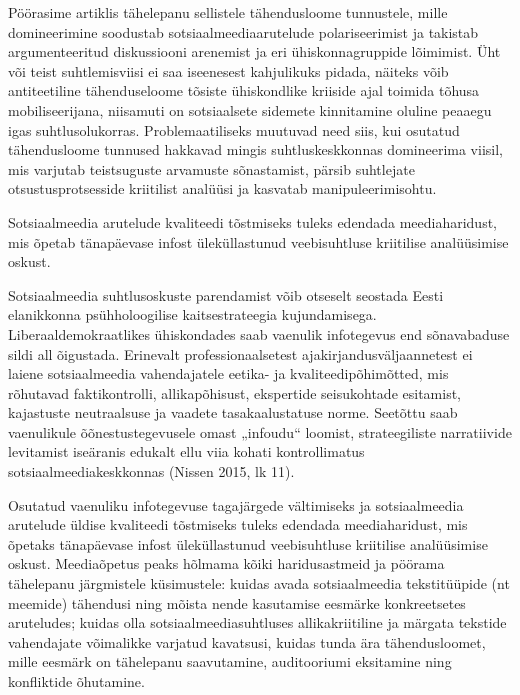 \documentclass[estonian,]{article}
\begin{document}
Pöörasime artiklis tähelepanu sellistele tähendusloome tunnustele, mille domineerimine soodustab sotsiaalmeediaarutelude polariseerimist ja takistab argumenteeritud diskussiooni arenemist ja eri ühiskonnagruppide lõimimist. Üht või teist suhtlemisviisi ei saa iseenesest kahjulikuks pidada, näiteks võib antiteetiline tähenduseloome tõsiste ühiskondlike kriiside ajal toimida tõhusa mobiliseerijana, niisamuti on sotsiaalsete sidemete kinnitamine oluline peaaegu igas suhtlusolukorras. Problemaatiliseks muutuvad need siis, kui osutatud tähendusloome tunnused hakkavad mingis suhtluskeskkonnas domineerima viisil, mis varjutab teistsuguste arvamuste sõnastamist, pärsib suhtlejate otsustusprotsesside kriitilist analüüsi ja kasvatab manipuleerimisohtu.

\begin{blockquote-left}
Sotsiaalmeedia arutelude kvaliteedi tõstmiseks tuleks edendada
meediaharidust, mis õpetab tänapäevase infost üleküllastunud
veebisuhtluse kriitilise analüüsimise oskust.
\end{blockquote-left}

Sotsiaalmeedia suhtlusoskuste parendamist võib otseselt seostada Eesti elanikkonna psühholoogilise kaitsestrateegia kujundamisega. Liberaaldemokraatlikes ühiskondades saab vaenulik infotegevus end sõnavabaduse sildi all õigustada. Erinevalt professionaalsetest ajakirjandusväljaannetest ei laiene sotsiaalmeedia vahendajatele eetika- ja kvaliteedipõhimõtted, mis rõhutavad faktikontrolli, allikapõhisust, ekspertide seisukohtade esitamist, kajastuste neutraalsuse ja vaadete tasakaalustatuse norme. Seetõttu saab vaenulikule õõnestustegevusele omast „infoudu`` loomist, strateegiliste narratiivide levitamist iseäranis edukalt ellu viia kohati kontrollimatus sotsiaalmeediakeskkonnas (Nissen 2015, lk 11).

Osutatud vaenuliku infotegevuse tagajärgede vältimiseks ja sotsiaalmeedia arutelude üldise kvaliteedi tõstmiseks tuleks edendada meediaharidust, mis õpetaks tänapäevase infost üleküllastunud veebisuhtluse kriitilise analüüsimise oskust. Meediaõpetus peaks hõlmama kõiki haridusastmeid ja pöörama tähelepanu järgmistele küsimustele: kuidas avada sotsiaalmeedia tekstitüüpide (nt meemide) tähendusi ning mõista nende kasutamise eesmärke konkreetsetes aruteludes; kuidas olla sotsiaalmeediasuhtluses allikakriitiline ja märgata tekstide vahendajate võimalikke varjatud kavatsusi, kuidas tunda ära tähendusloomet, mille eesmärk on tähelepanu saavutamine, auditooriumi eksitamine ning konfliktide õhutamine.
\end{document}
